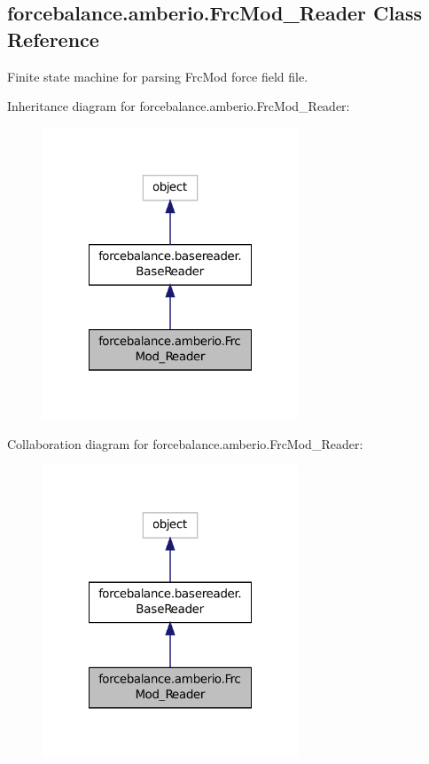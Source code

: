\hypertarget{classforcebalance_1_1amberio_1_1FrcMod__Reader}{\subsection{forcebalance.\-amberio.\-Frc\-Mod\-\_\-\-Reader Class Reference}
\label{classforcebalance_1_1amberio_1_1FrcMod__Reader}
}


Finite state machine for parsing Frc\-Mod force field file.  




Inheritance diagram for forcebalance.\-amberio.\-Frc\-Mod\-\_\-\-Reader\-:
\nopagebreak
\begin{figure}[H]
\begin{center}
\leavevmode
\includegraphics[width=216pt]{classforcebalance_1_1amberio_1_1FrcMod__Reader__inherit__graph}
\end{center}
\end{figure}


Collaboration diagram for forcebalance.\-amberio.\-Frc\-Mod\-\_\-\-Reader\-:
\nopagebreak
\begin{figure}[H]
\begin{center}
\leavevmode
\includegraphics[width=216pt]{classforcebalance_1_1amberio_1_1FrcMod__Reader__coll__graph}
\end{center}
\end{figure}
